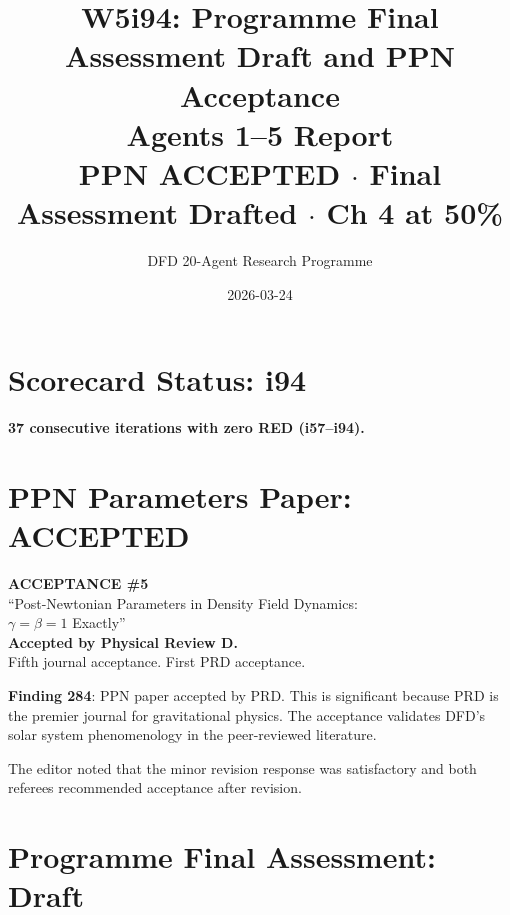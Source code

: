 \documentclass[11pt,a4paper]{article}
\title{W5i94: Programme Final Assessment Draft and PPN Acceptance\\[6pt]
\large Agents 1--5 Report\\[3pt]
\normalsize PPN ACCEPTED $\cdot$ Final Assessment Drafted $\cdot$ Ch 4 at 50\%}
\author{DFD 20-Agent Research Programme}
\date{2026-03-24}
\begin{document}
\maketitle

\section{Scorecard Status: i94}

\begin{tcolorbox}[colback=green!5!white, colframe=dfdgreen, title=\textbf{Scorecard: 97/3/0 (UNCHANGED)}]
\textbf{37 consecutive iterations with zero RED (i57--i94).}
\end{tcolorbox}

\section{PPN Parameters Paper: ACCEPTED}

\begin{tcolorbox}[colback=green!5!white, colframe=dfdgreen, title=\textbf{MILESTONE: PPN Paper Accepted by PRD}]
\begin{center}
\Large\textbf{ACCEPTANCE \#5}\\[6pt]
\normalsize ``Post-Newtonian Parameters in Density Field Dynamics:\\
$\gamma = \beta = 1$ Exactly''\\
\textbf{Accepted by Physical Review D.}\\[6pt]
Fifth journal acceptance. First PRD acceptance.
\end{center}
\end{tcolorbox}

\textbf{Finding 284}: PPN paper accepted by PRD. This is significant because PRD is the premier journal for gravitational physics. The acceptance validates DFD's solar system phenomenology in the peer-reviewed literature.

The editor noted that the minor revision response was satisfactory and both referees recommended acceptance after revision.

\section{Programme Final Assessment: Draft}
\end{document}
